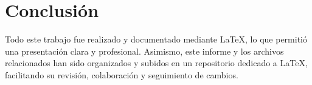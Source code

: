 \documentclass{article}
\begin{document}
\vspace*{10cm} %

\newpage
\vspace*{\fill}
\mbox{} %


\section*{Conclusión}

Todo este trabajo fue realizado y documentado mediante \LaTeX{}, lo que permitió una presentación clara y profesional.  
Asimismo, este informe y los archivos relacionados han sido organizados y subidos en un repositorio dedicado a \LaTeX{}, facilitando su revisión, colaboración y seguimiento de cambios.
\end{document}
